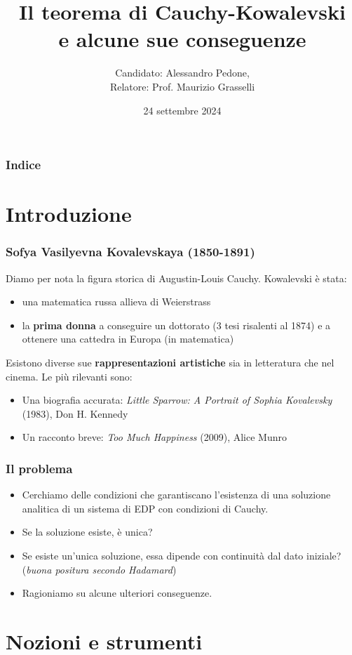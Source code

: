 \documentclass[serif,notheorems]{beamer}
\title{Il teorema di Cauchy-Kowalevski\\ e alcune sue conseguenze }
\author{Candidato: Alessandro Pedone,\\ Relatore: Prof. Maurizio Grasselli }
\institute{Politecnico di Milano}
\date{24 settembre 2024}
\theoremstyle{definition} %
\theoremstyle{remark}
\begin{document}
\frame{\titlepage}
\begin{frame}
    \frametitle{Indice}
    \tableofcontents
\end{frame}


\section{Introduzione}

\begin{frame}
\frametitle{Sofya Vasilyevna Kovalevskaya (1850-1891)}
Diamo per nota la figura storica di Augustin-Louis Cauchy. 
Kowalevski è stata:
\begin{itemize}
\item una matematica russa allieva di Weierstrass
\item la \textbf{prima donna} a conseguire un dottorato (3 tesi risalenti al 1874) e a ottenere una cattedra in Europa (in matematica)
\end{itemize}
\end{frame}

\begin{frame}
Esistono diverse sue \textbf{rappresentazioni artistiche} sia in letteratura che nel cinema. Le più rilevanti sono:
\begin{itemize}
\item Una biografia accurata: \textit{Little Sparrow: A Portrait of Sophia Kovalevsky} (1983), Don H. Kennedy
\item Un racconto breve: \textit{Too Much Happiness} (2009), Alice Munro
\end{itemize}
\end{frame}

\begin{frame}
\frametitle{Il problema}
\begin{itemize}
\item Cerchiamo delle condizioni che garantiscano l'esistenza di una soluzione analitica di un sistema di EDP con condizioni di Cauchy.
\item Se la soluzione esiste, è unica?
\item Se esiste un'unica soluzione, essa dipende con continuità dal dato iniziale? (\textit{buona positura secondo Hadamard})
\item Ragioniamo su alcune ulteriori conseguenze.
\end{itemize}
\end{frame}


\section{Nozioni e strumenti}
\end{document}
